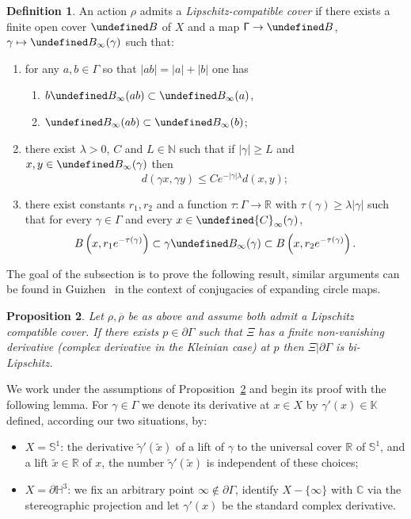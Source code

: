 \documentclass[10pt,a4paper]{article}
\newtheorem{prop}{Proposition}[section]
\theoremstyle{definition}
\newtheorem{defi}[prop]{Definition}
\let\cal\undefined
\newcommand*{\romanenumi}{\renewcommand*{\theenumi}{\roman{enumi}}\renewcommand{\labelenumi}{(\theenumi)}}
\renewcommand{\sf}[1]{{\mathsf{#1}}}
\newcommand{\G}{\sf{\Gamma}}
\newcommand{\cal}{\mathcal}
\newcommand{\cone}{\cal{C}}
\newcommand{\R}{\mathbb{R}}
\newcommand{\RR}{\R}
\newcommand{\C}{\mathbb{C}}
\newcommand{\N}{\mathbb{N}}
\renewcommand{\H}{\mathbb{H}}
\newcommand{\K}{\mathbb{K}}
\newcommand{\bbS}{\mathbb{S}}
\newcommand{\g}{\gamma}
\newcommand{\bord}{\partial}
\newcommand{\slroot}{{\tau}}
\newcommand{\ovrho}{\overline{\!\rho}}
\renewcommand{\/}{\backslash}
\newcommand{\<}{\langle}
\renewcommand{\>}{\rangle}
\numberwithin{equation}{section}
\begin{document}
\begin{defi}\label{assuA}
An action $\rho$ admits a \emph{Lipschitz-compatible cover} if there exists a finite open cover $\cal B$ of $X$ and a map $\G\to\cal B$, $\gamma\mapsto\cal B_\infty(\g)$ such that:
\begin{enumerate}\romanenumi
\item\label{defi7.1.1} for any $a,b\in \G$ so that $|ab|=|a|+|b|$ one has
\begin{enumerate}
\item\label{defi7.1.1.a} $b\cal B_{\infty}(ab)\subset \cal B_\infty(a)$,
\item\label{defi7.1.1.b} $\cal B_{\infty}(ab)\subset\cal B_{\infty}(b)$;
\end{enumerate}
\item\label{defi7.1.2} there exist $\lambda>0$, $C$ and $L\in\N$ such that if
$|\g|\geq L$ and $x,y\in\cal B_\infty(\g)$ then
\[
d(\g x,\g y)\leq Ce^{-|\g|\lambda}d(x,y);
\]
\item\label{defi7.1.3} there exist constants $r_1,r_2$ and a function $\slroot:\G\to\RR$ with $\slroot(\g)\geq\lambda|\g|$ such that for every $\g\in\G$ and every $x\in\cone_\infty(\g)$,
\[
B\left(x,r_1e^{-\slroot(\g)}\right)\subset\g\cal B_\infty(\g)\subset B\left(x, r_2e^{-\slroot(\g)}\right).
\]
\end{enumerate}
\end{defi}

The goal of the subsection is to prove the following result, similar arguments can be found in Guizhen~\cite{cui} in the context of conjugacies of expanding circle maps.

\begin{prop}\label{c.indepPer}
Let $\rho,\ovrho$ be as above and assume both admit a Lipschitz compatible cover. If there exists $p\in\bord\G$ such that $\Xi$ has a finite non-vanishing derivative (complex derivative in the Kleinian case) at $p$ then $\Xi|\bord\G$ is bi-Lipschitz.
\end{prop}

We work under the assumptions of Proposition~\ref{c.indepPer} and begin its proof with the following lemma. For $\g\in\G$ we denote its derivative at $x\in X$ by $\g'(x)\in\K$ defined, according our two situations, by:
\begin{itemize}
\item $X=\bbS^1$: the derivative $\tilde\g'(\tilde x)$ of a lift of $\g$ to the universal cover $\R$ of $\bbS^1$, and a lift $\tilde x\in\R$ of $x$, the number $\tilde \g'(\tilde x)$ is independent of these choices;
\item $X=\bord\H^3$: we fix an arbitrary point $\infty\notin\bord\G$, identify $X-\{\infty\}$ with $\C$ via the stereographic projection and let $\g'(x)$ be the standard complex derivative.
\end{itemize}
\end{document}

